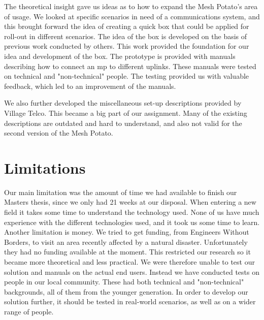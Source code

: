 The theoretical insight gave us ideas as to how to expand the Mesh Potato's area of usage. We looked at specific scenarios in need of a communications system, and this brought forward the idea of creating a \gls{quick} box that could be applied for roll-out in different scenarios. The idea of the box is developed on the basis of previous work conducted by others. This work provided the foundation for our idea and development of the box. The prototype is provided with manuals describing how to connect an \gls{mp} to different uplinks. These manuals were tested on technical and "non-technical" people. The testing provided us with valuable feedback, which led to an improvement of the manuals. 

We also further developed the miscellaneous set-up descriptions provided by Village Telco. This became a big part of our assignment. Many of the existing descriptions are outdated and hard to understand, and also not valid for the second version of the Mesh Potato.



\section{Limitations}
Our main limitation was the amount of time we had available to finish our Masters thesis, since we only had 21 weeks at our disposal. When entering a new field it takes some time to understand the technology used. None of us have much experience with the different technologies used, and it took us some time to learn. Another limitation is money. We tried to get funding, from Engineers Without Borders, to visit an area recently affected by a natural disaster. Unfortunately they had no funding available at the moment. This restricted our research so it became more theoretical and less practical. We were therefore unable to test our solution and manuals on the actual end users. Instead we have conducted tests on people in our local community. These had both technical and "non-technical" backgrounds, all of them from the younger generation. In order to develop our solution further, it should be tested in real-world scenarios, as well as on a wider range of people. 


